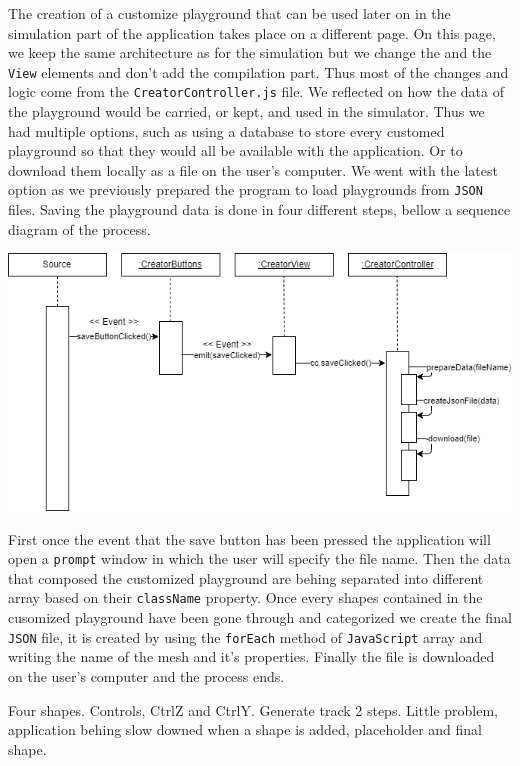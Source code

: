 \documentclass{scrbook}
\begin{document}
The creation of a customize playground that can be used later on in the simulation part of the application takes place on a different page. On this page, we keep the same architecture as for the simulation but we change the  and the \texttt{View} elements 
and don't add the compilation part. Thus most of the changes and logic come from the \texttt{CreatorController.js} file. We reflected  on how the data of the playground would be carried, or kept, and used in the simulator. Thus we had multiple options,
such as using a database to store every customed playground so that they would all be available with the application. Or to download  them locally as a file on the user's computer. We went with the latest option as we previously prepared the program to load playgrounds from \texttt{JSON} files.
Saving the playground data is done in four different steps, bellow a sequence diagram of the process.
\begin{center}
  \includegraphics[scale=1]{./savepg_sd}
\end{center}

First once the event that the save button has been pressed the application will open a \texttt{prompt} window in which the user will specify the file name. Then the data that composed the customized playground are behing separated into different array based on their \texttt{className} property. 
Once every shapes contained in the cusomized playground have been gone through and categorized we create the final \texttt{JSON} file, it is created by using the \texttt{forEach} method of \texttt{JavaScript} array and writing the name of the mesh and it's properties. 
Finally the file is downloaded on the user's computer and the process ends.

Four shapes.
Controls, CtrlZ and CtrlY.
Generate track 2 steps.
Little problem, application behing slow downed when a shape is added, placeholder and final shape.
\end{document}
